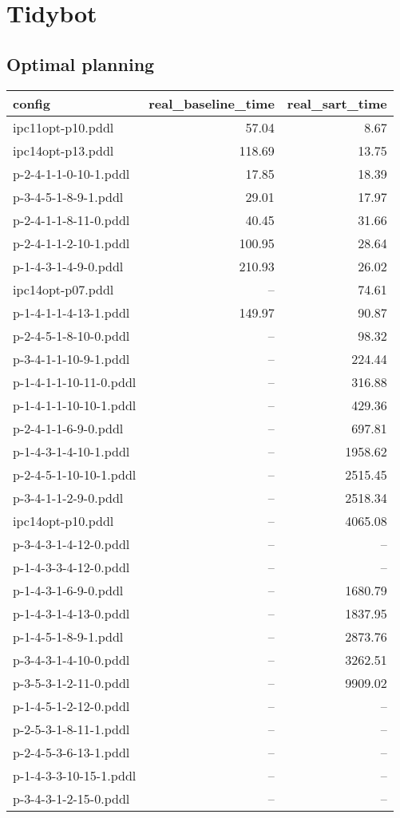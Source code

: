 \documentclass{article}
\begin{document}
                    
                \newpage \section{Tidybot}
                    \subsection*{Optimal planning}
                    
                            \begin{center}
                            \scriptsize
                            \begin{tabular}{@{}l|r|r@{}}
                            config & real\_baseline\_time & real\_sart\_time\\\midrule
                             ipc11opt-p10.pddl&57.04&8.67\\
 ipc14opt-p13.pddl&118.69&13.75\\
 p-2-4-1-1-0-10-1.pddl&17.85&18.39\\
 p-3-4-5-1-8-9-1.pddl&29.01&17.97\\
 p-2-4-1-1-8-11-0.pddl&40.45&31.66\\
 p-2-4-1-1-2-10-1.pddl&100.95&28.64\\
 p-1-4-3-1-4-9-0.pddl&210.93&26.02\\
 ipc14opt-p07.pddl&--&74.61\\
 p-1-4-1-1-4-13-1.pddl&149.97&90.87\\
 p-2-4-5-1-8-10-0.pddl&--&98.32\\
 p-3-4-1-1-10-9-1.pddl&--&224.44\\
 p-1-4-1-1-10-11-0.pddl&--&316.88\\
 p-1-4-1-1-10-10-1.pddl&--&429.36\\
 p-2-4-1-1-6-9-0.pddl&--&697.81\\
 p-1-4-3-1-4-10-1.pddl&--&1958.62\\
 p-2-4-5-1-10-10-1.pddl&--&2515.45\\
 p-3-4-1-1-2-9-0.pddl&--&2518.34\\
 ipc14opt-p10.pddl&--&4065.08\\
 p-3-4-3-1-4-12-0.pddl&--&--\\
 p-1-4-3-3-4-12-0.pddl&--&--\\
 p-1-4-3-1-6-9-0.pddl&--&1680.79\\
 p-1-4-3-1-4-13-0.pddl&--&1837.95\\
 p-1-4-5-1-8-9-1.pddl&--&2873.76\\
 p-3-4-3-1-4-10-0.pddl&--&3262.51\\
 p-3-5-3-1-2-11-0.pddl&--&9909.02\\
 p-1-4-5-1-2-12-0.pddl&--&--\\
 p-2-5-3-1-8-11-1.pddl&--&--\\
 p-2-4-5-3-6-13-1.pddl&--&--\\
 p-1-4-3-3-10-15-1.pddl&--&--\\
 p-3-4-3-1-2-15-0.pddl&--&--
                            \end{tabular}
                            \end{center}
                    
\end{document}
